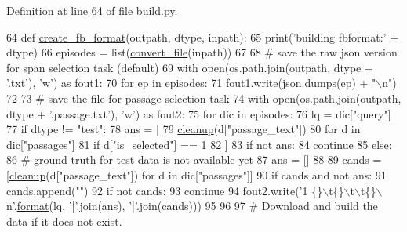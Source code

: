 Definition at line 64 of file build.\+py.


\begin{DoxyCode}
64 \textcolor{keyword}{def }\hyperlink{namespaceparlai_1_1tasks_1_1wikiqa_1_1build_a554828702769592403db58c955d1dfe3}{create\_fb\_format}(outpath, dtype, inpath):
65     print(\textcolor{stringliteral}{'building fbformat:'} + dtype)
66     episodes = list(\hyperlink{namespaceparlai_1_1tasks_1_1ms__marco_1_1build_ac19db5d0ad4ba8559f6aca64f2fe192b}{convert\_file}(inpath))
67 
68     \textcolor{comment}{# save the raw json version for span selection task (default)}
69     with open(os.path.join(outpath, dtype + \textcolor{stringliteral}{'.txt'}), \textcolor{stringliteral}{'w'}) \textcolor{keyword}{as} fout1:
70         \textcolor{keywordflow}{for} ep \textcolor{keywordflow}{in} episodes:
71             fout1.write(json.dumps(ep) + \textcolor{stringliteral}{"\(\backslash\)n"})
72 
73     \textcolor{comment}{# save the file for passage selection task}
74     with open(os.path.join(outpath, dtype + \textcolor{stringliteral}{'.passage.txt'}), \textcolor{stringliteral}{'w'}) \textcolor{keyword}{as} fout2:
75         \textcolor{keywordflow}{for} dic \textcolor{keywordflow}{in} episodes:
76             lq = dic[\textcolor{stringliteral}{"query"}]
77             \textcolor{keywordflow}{if} dtype != \textcolor{stringliteral}{"test"}:
78                 ans = [
79                     \hyperlink{namespaceparlai_1_1tasks_1_1ms__marco_1_1build_a6c94ade2f99fa70bf4103a22a1fbdc42}{cleanup}(d[\textcolor{stringliteral}{"passage\_text"}])
80                     \textcolor{keywordflow}{for} d \textcolor{keywordflow}{in} dic[\textcolor{stringliteral}{"passages"}]
81                     \textcolor{keywordflow}{if} d[\textcolor{stringliteral}{"is\_selected"}] == 1
82                 ]
83                 \textcolor{keywordflow}{if} \textcolor{keywordflow}{not} ans:
84                     \textcolor{keywordflow}{continue}
85             \textcolor{keywordflow}{else}:
86                 \textcolor{comment}{# ground truth for test data is not available yet}
87                 ans = []
88 
89             cands = [\hyperlink{namespaceparlai_1_1tasks_1_1ms__marco_1_1build_a6c94ade2f99fa70bf4103a22a1fbdc42}{cleanup}(d[\textcolor{stringliteral}{"passage\_text"}]) \textcolor{keywordflow}{for} d \textcolor{keywordflow}{in} dic[\textcolor{stringliteral}{"passages"}]]
90             \textcolor{keywordflow}{if} cands \textcolor{keywordflow}{and} \textcolor{keywordflow}{not} ans:
91                 cands.append(\textcolor{stringliteral}{""})
92             \textcolor{keywordflow}{if} \textcolor{keywordflow}{not} cands:
93                 \textcolor{keywordflow}{continue}
94             fout2.write(\textcolor{stringliteral}{'1 \{\}\(\backslash\)t\{\}\(\backslash\)t\(\backslash\)t\{\}\(\backslash\)n'}.\hyperlink{namespaceparlai_1_1chat__service_1_1services_1_1messenger_1_1shared__utils_a32e2e2022b824fbaf80c747160b52a76}{format}(lq, \textcolor{stringliteral}{'|'}.join(ans), \textcolor{stringliteral}{'|'}.join(cands)))
95 
96 
97 \textcolor{comment}{# Download and build the data if it does not exist.}
\end{DoxyCode}
